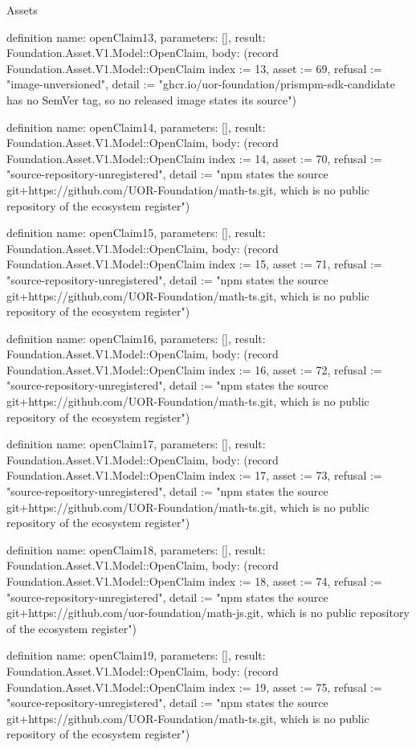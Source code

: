 \begin{lexlean}{Assets}
\begin{semanticmodule}
definition{
  name: openClaim13,
  parameters: [],
  result: Foundation.Asset.V1.Model::OpenClaim,
  body: (record Foundation.Asset.V1.Model::OpenClaim {index := 13, asset := 69, refusal := "image-unversioned", detail := "ghcr.io/uor-foundation/prismpm-sdk-candidate has no SemVer tag, so no released image states its source"})
}

definition{
  name: openClaim14,
  parameters: [],
  result: Foundation.Asset.V1.Model::OpenClaim,
  body: (record Foundation.Asset.V1.Model::OpenClaim {index := 14, asset := 70, refusal := "source-repository-unregistered", detail := "npm states the source git+https://github.com/UOR-Foundation/math-ts.git, which is no public repository of the ecosystem register"})
}

definition{
  name: openClaim15,
  parameters: [],
  result: Foundation.Asset.V1.Model::OpenClaim,
  body: (record Foundation.Asset.V1.Model::OpenClaim {index := 15, asset := 71, refusal := "source-repository-unregistered", detail := "npm states the source git+https://github.com/UOR-Foundation/math-ts.git, which is no public repository of the ecosystem register"})
}

definition{
  name: openClaim16,
  parameters: [],
  result: Foundation.Asset.V1.Model::OpenClaim,
  body: (record Foundation.Asset.V1.Model::OpenClaim {index := 16, asset := 72, refusal := "source-repository-unregistered", detail := "npm states the source git+https://github.com/UOR-Foundation/math-ts.git, which is no public repository of the ecosystem register"})
}

definition{
  name: openClaim17,
  parameters: [],
  result: Foundation.Asset.V1.Model::OpenClaim,
  body: (record Foundation.Asset.V1.Model::OpenClaim {index := 17, asset := 73, refusal := "source-repository-unregistered", detail := "npm states the source git+https://github.com/UOR-Foundation/math-ts.git, which is no public repository of the ecosystem register"})
}

definition{
  name: openClaim18,
  parameters: [],
  result: Foundation.Asset.V1.Model::OpenClaim,
  body: (record Foundation.Asset.V1.Model::OpenClaim {index := 18, asset := 74, refusal := "source-repository-unregistered", detail := "npm states the source git+https://github.com/uor-foundation/math-js.git, which is no public repository of the ecosystem register"})
}

definition{
  name: openClaim19,
  parameters: [],
  result: Foundation.Asset.V1.Model::OpenClaim,
  body: (record Foundation.Asset.V1.Model::OpenClaim {index := 19, asset := 75, refusal := "source-repository-unregistered", detail := "npm states the source git+https://github.com/UOR-Foundation/math-ts.git, which is no public repository of the ecosystem register"})
}


\end{semanticmodule}
\end{lexlean}
